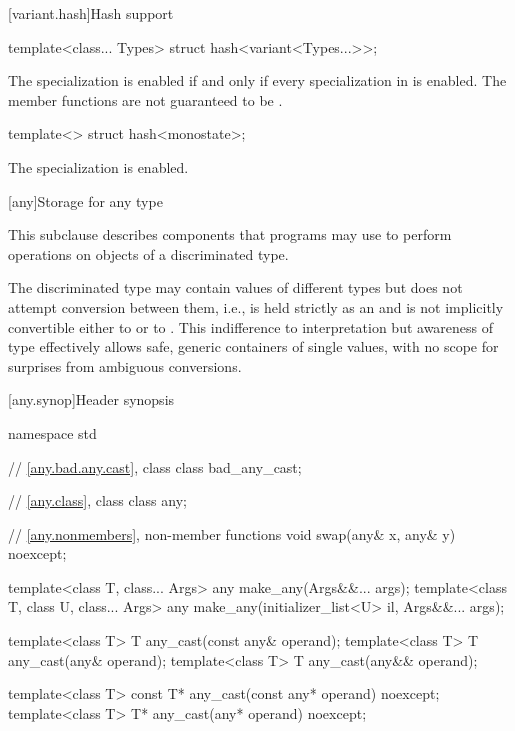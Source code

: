[variant.hash]{Hash support}

%
\begin{itemdecl}
template<class... Types> struct hash<variant<Types...>>;
\end{itemdecl}

\begin{itemdescr}
\pnum
The specialization  is enabled
if and only if every specialization in  is enabled.
The member functions are not guaranteed to be .
\end{itemdescr}

%
\begin{itemdecl}
template<> struct hash<monostate>;
\end{itemdecl}

\begin{itemdescr}
\pnum
The specialization is enabled.
\end{itemdescr}


[any]{Storage for any type}

\pnum
This subclause describes components that \Cpp{} programs may use to perform operations on objects of a discriminated type.

\pnum
\begin{note}
The discriminated type may contain values of different types but does not attempt conversion between them,
i.e.,  is held strictly as an  and is not implicitly convertible either to  or to .
This indifference to interpretation but awareness of type effectively allows safe, generic containers of single values, with no scope for surprises from ambiguous conversions.
\end{note}

[any.synop]{Header  synopsis}

%

\begin{codeblock}
namespace std {
  // \ref{any.bad.any.cast}, class 
  class bad_any_cast;

  // \ref{any.class}, class 
  class any;

  // \ref{any.nonmembers}, non-member functions
  void swap(any& x, any& y) noexcept;

  template<class T, class... Args>
    any make_any(Args&&... args);
  template<class T, class U, class... Args>
    any make_any(initializer_list<U> il, Args&&... args);

  template<class T>
    T any_cast(const any& operand);
  template<class T>
    T any_cast(any& operand);
  template<class T>
    T any_cast(any&& operand);

  template<class T>
    const T* any_cast(const any* operand) noexcept;
  template<class T>
    T* any_cast(any* operand) noexcept;
}
\end{codeblock}

